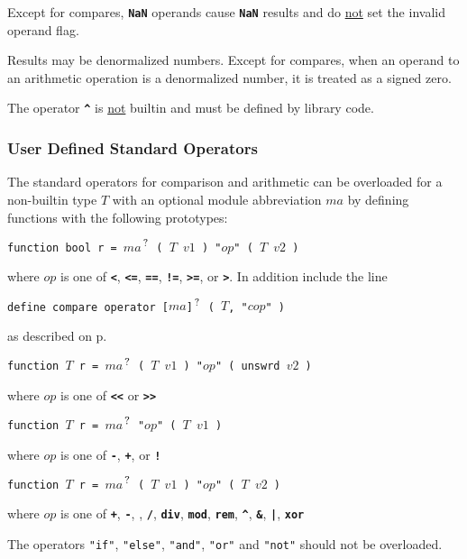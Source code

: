 \documentclass[12pt]{article}
\newcommand{\TT}[1]{{\tt \bfseries #1}}
\newcommand{\pagref}[1]{p\pageref{#1}}
\newcommand{\QMARK}{{$^{\,\mbox{\footnotesize ?}}$}}
\newenvironment{indpar}[1][0.3in]%
	{\begin{list}{}%
		     {\setlength{\itemsep}{0in}%
		      \setlength{\topsep}{0in}%
		      \setlength{\parsep}{1ex}%
		      \setlength{\labelwidth}{#1}%
		      \setlength{\leftmargin}{#1}%
		      \addtolength{\leftmargin}{\labelsep}}%
	 \item}%
	{\end{list}}
\begin{document}
Except for compares, \TT{NaN} operands cause \TT{NaN} results and
do \underline{not} set the invalid operand flag.

Results may be denormalized numbers.  Except for compares,
when an operand to an arithmetic operation is a denormalized
number, it is treated as a signed zero.

The operator
\TT{\textasciicircum} is \underline{not} builtin and must be
defined by library code.

\subsubsection{User Defined Standard Operators}
\label{USER-DEFINED-STANDARD-OPERATORS}

The standard operators for comparison and arithmetic can be overloaded
for a non-builtin type $T$ with an optional module abbreviation
$ma$ by defining functions with the following prototypes:
\begin{indpar}
{\tt function bool r = $ma$\QMARK{} ( $T$ $v1$ ) "$op$" ( $T$ $v2$ )}
\begin{indpar}
where $op$ is one of \TT{<}, \TT{<=}, \TT{==}, \TT{!=}, \TT{>=}, or \TT{>}.
In addition include the line
\begin{center}
\tt define compare operator [$ma$]\QMARK{} ( $T$, "$cop$" )
\end{center}
as described on \pagref{DEFINE-COMPARE-OPERATOR}.
\end{indpar}

{\tt function $T$ r = $ma$\QMARK{} ( $T$ $v1$ ) "$op$" ( unswrd $v2$ )}
\begin{indpar}
where $op$ is one of \TT{<{}<} or \TT{>{}>}
\end{indpar}

{\tt function $T$ r = $ma$\QMARK{} "$op$" ( $T$ $v1$ )}
\begin{indpar}
where $op$ is one of \TT{-}, \TT{+}, or \TT{!}
\end{indpar}

{\tt function $T$ r = $ma$\QMARK{} ( $T$ $v1$ ) "$op$" ( $T$ $v2$ )}
\begin{indpar}
where $op$ is one of
    \TT{+}, \TT{-},
    \TT{*}, \TT{/}, \TT{div}, \TT{mod}, \TT{rem}, \TT{\textasciicircum},
    \TT{\&}, \TT{|}, \TT{xor}
\end{indpar}

\end{indpar}


The operators {\tt "if"}, {\tt "else"}, {\tt "and"},
{\tt "or"} and {\tt "not"} should not be overloaded.
\end{document}
